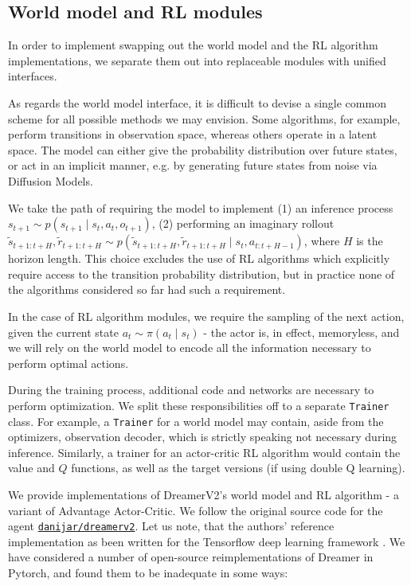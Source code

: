 \documentclass[en]{pracamgr}
\begin{document}
\subsection{World model and RL modules}

In order to implement swapping out the world model and the RL algorithm implementations, we separate them out into replaceable modules with unified interfaces.

As regards the world model interface, it is difficult to devise a single common scheme for all possible methods we may envision. Some algorithms, for example, perform transitions in observation space, whereas others operate in a latent space. The model can either give the probability distribution over future states, or act in an implicit manner, e.g. by generating future states from noise via Diffusion Models.

\begin{sloppypar}
  We take the path of requiring the model to implement (1) an inference process $s_{t+1} \sim p(s_{t+1} \mid s_t, a_t, o_{t+1})$, (2) performing an imaginary rollout $\widetilde{s}_{t+1:t+H}, \widetilde{r}_{t+1:t+H} \sim p(\widetilde{s}_{t+1:t+H}, \widetilde{r}_{t+1:t+H} \mid s_t, a_{t:t+H-1})$, where $H$ is the horizon length. This choice excludes the use of RL algorithms which explicitly require access to the transition probability distribution, but in practice none of the algorithms considered so far had such a requirement.
\end{sloppypar}

In the case of RL algorithm modules, we require the sampling of the next action, given the current state $a_t \sim \pi(a_t \mid s_t)$ - the actor is, in effect, memoryless, and we will rely on the world model to encode all the information necessary to perform optimal actions.

During the training process, additional code and networks are necessary to perform optimization. We split these responsibilities off to a separate {\tt Trainer} class. For example, a {\tt Trainer} for a world model may contain, aside from the optimizers, observation decoder, which is strictly speaking not necessary during inference. Similarly, a trainer for an actor-critic RL algorithm would contain the value and $Q$ functions, as well as the target versions (if using double Q learning).

We provide implementations of DreamerV2's world model and RL algorithm - a variant of Advantage Actor-Critic. We follow the original source code for the agent \href{https://github.com/danijar/dreamerv2}{\tt danijar/dreamerv2}. Let us note, that the authors' reference implementation as been written for the Tensorflow deep learning framework \autocite{tensorflow2015-whitepaper}. We have considered a number of open-source reimplementations of Dreamer in Pytorch, and found them to be inadequate in some ways:
\end{document}
